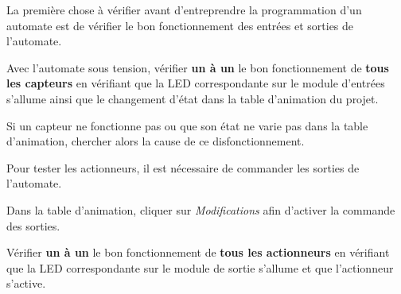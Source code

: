 La première chose à vérifier avant d'entreprendre la programmation d'un automate est de vérifier le bon fonctionnement des entrées et sorties de l'automate.
\begin{UPSTIactivite}
	Avec l'automate sous tension, vérifier \textbf{un à un} le bon fonctionnement de \textbf{tous les capteurs} en vérifiant que la LED correspondante sur le module d'entrées s'allume ainsi que le changement d'état dans la table d'animation du projet.

	Si un capteur ne fonctionne pas ou que son état ne varie pas dans la table d'animation, chercher alors la cause de ce disfonctionnement.
\end{UPSTIactivite}

\begin{UPSTIactivite}
Pour tester les actionneurs, il est nécessaire de commander les sorties de l’automate.

Dans la table d'animation, cliquer sur \textit{Modifications} afin d'activer la commande des sorties.

Vérifier \textbf{un à un} le bon fonctionnement de \textbf{tous les actionneurs} en vérifiant que la LED correspondante sur le module de sortie s'allume et que l'actionneur s'active.
\end{UPSTIactivite}
